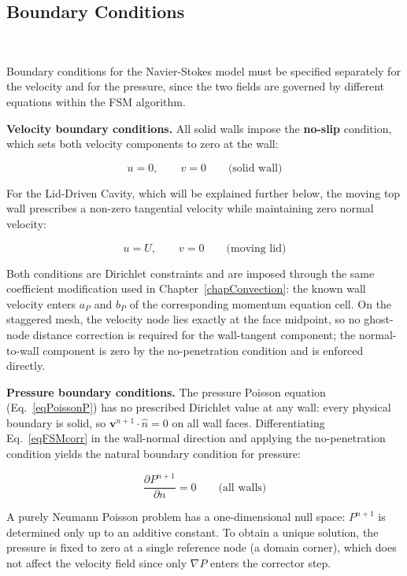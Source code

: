 \subsection{Boundary Conditions}~\label{secNSBC}

Boundary conditions for the Navier-Stokes model must be specified separately for the velocity and for the pressure, since the two fields are governed by different equations within the FSM algorithm.

\textbf{Velocity boundary conditions.} All solid walls impose the \textbf{no-slip} condition, which sets both velocity components to zero at the wall:

\begin{equation}\label{eqNSBCNoSlip}
    u = 0, \qquad v = 0 \qquad \text{(solid wall)}
\end{equation}

For the Lid-Driven Cavity, which will be explained further below, the moving top wall prescribes a non-zero tangential velocity while maintaining zero normal velocity:

\begin{equation}\label{eqNSBCLid}
    u = U, \qquad v = 0 \qquad \text{(moving lid)}
\end{equation}

Both conditions are Dirichlet constraints and are imposed through the same coefficient modification used in Chapter~\ref{chapConvection}: the known wall velocity enters $a_P$ and $b_P$ of the corresponding momentum equation cell. On the staggered mesh, the velocity node lies exactly at the face midpoint, so no ghost-node distance correction is required for the wall-tangent component; the normal-to-wall component is zero by the no-penetration condition and is enforced directly.

\textbf{Pressure boundary conditions.} The pressure Poisson equation (Eq.~\eqref{eqPoissonP}) has no prescribed Dirichlet value at any wall: every physical boundary is solid, so $\mathbf{v}^{n+1} \cdot \hat{n} = 0$ on all wall faces. Differentiating Eq.~\eqref{eqFSMcorr} in the wall-normal direction and applying the no-penetration condition yields the natural boundary condition for pressure:

\begin{equation}\label{eqNSBCPressure}
    \frac{\partial P^{n+1}}{\partial n} = 0 \qquad \text{(all walls)}
\end{equation}

A purely Neumann Poisson problem has a one-dimensional null space: $P^{n+1}$ is determined only up to an additive constant. To obtain a unique solution, the pressure is fixed to zero at a single reference node (a domain corner), which does not affect the velocity field since only $\nabla P$ enters the corrector step.



